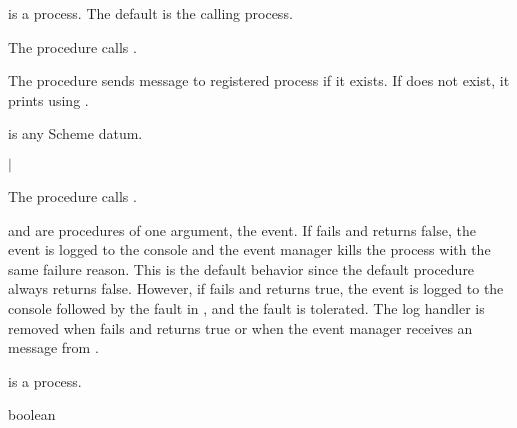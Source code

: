  is a process. The default is the calling process.

\begin{procedure}
\end{procedure}
\returns{} 

The  procedure calls
.

\begin{procedure}
\end{procedure}
\returns{} 

The  procedure sends message
 to registered process
 if it exists. If  does not exist,
it prints  using
.

 is any Scheme datum.

\begin{procedure}
\end{procedure}
\returns{}  $|$ 

The  procedure calls
.

 and  are procedures of one argument, the event.
If  fails and  returns false, the event is logged
to the console and the event manager kills the 
process with the same failure reason.
This is the default behavior since the default  procedure always
returns false.
However, if  fails and  returns true, the event is
logged to the console followed by the fault in , and the fault is
tolerated.
The log handler is removed when
 fails and  returns true or when the event manager
receives an  message from .

 is a process.

\begin{procedure}
\end{procedure}
\returns{} boolean

